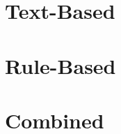 \section{Text-Based}
\label{sec:3_related_work/1_text_based}



\section{Rule-Based}
\label{sec:3_related_work/2_rule_based}



\section{Combined}
\label{sec:3_related_work/3_combined}

